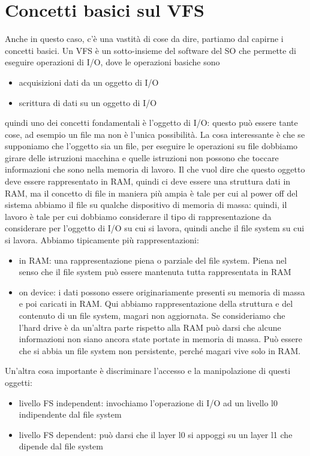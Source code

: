 \documentclass[12pt, oneside]{extbook}
\begin{document}
\section{Concetti basici sul VFS}
Anche in questo caso, c'è una vastità di cose da dire, partiamo dal capirne i concetti basici. Un VFS è un sotto-insieme del software del SO che permette di eseguire operazioni di I/O, dove le operazioni basiche sono
\begin{itemize}
\item acquisizioni dati da un oggetto di I/O
\item scrittura di dati su un oggetto di I/O
\end{itemize}
quindi uno dei concetti fondamentali è l'oggetto di I/O: questo può essere tante cose, ad esempio un file ma non è l'unica possibilità. La cosa interessante è che se supponiamo che l'oggetto sia un file, per eseguire le operazioni su file dobbiamo girare delle istruzioni macchina e quelle istruzioni non possono che toccare informazioni che sono nella memoria di lavoro. Il che vuol dire che questo oggetto deve essere rappresentato in RAM, quindi ci deve essere una struttura dati in RAM, ma il concetto di file in maniera più ampia è tale per cui al power off del sistema abbiamo il file su qualche dispositivo di memoria di massa: quindi, il lavoro è tale per cui dobbiamo considerare il tipo di rappresentazione da considerare per l'oggetto di I/O su cui si lavora, quindi anche il file system su cui si lavora. Abbiamo tipicamente più rappresentazioni:
\begin{itemize}
\item in RAM: una rappresentazione piena o parziale del file system. Piena nel senso che il file system può essere mantenuta tutta rappresentata in RAM
\item on device: i dati possono essere originariamente presenti su memoria di massa e poi caricati in RAM. Qui abbiamo rappresentazione della struttura e del contenuto di un file system, magari non aggiornata. Se consideriamo che l'hard drive è da un'altra parte rispetto alla RAM può darsi che alcune informazioni non siano ancora state portate in memoria di massa. Può essere che si abbia un file system non persistente, perché magari vive solo in RAM.
\end{itemize}
Un'altra cosa importante è discriminare l'accesso e la manipolazione di questi oggetti:
\begin{itemize}
\item livello FS independent: invochiamo l'operazione di I/O ad un livello l0 indipendente dal file system
\item livello FS dependent: può darsi che il layer l0 si appoggi su un layer l1 che dipende dal file system
\end{itemize}
\end{document}
